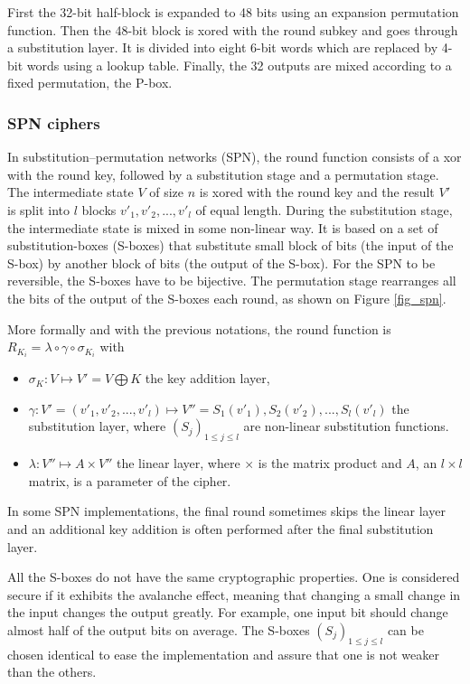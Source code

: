 \documentclass[11pt]{sdm}
\begin{document}
First the 32-bit half-block is expanded to 48 bits using an expansion permutation function.
Then the 48-bit block is xored with the round subkey and goes through a substitution layer.
It is divided into eight 6-bit words which are replaced by 4-bit words using a lookup table.
Finally, the 32 outputs are mixed according to a fixed permutation, the P-box.


\subsubsection{SPN ciphers}

In substitution–permutation networks (SPN), the round function consists of a xor with the round key, followed by a substitution stage and a permutation stage.
The intermediate state $V$ of size $n$ is xored with the round key and the result $V'$ is split into $l$ blocks $v'_1,v'_2,...,v'_l$ of equal length.
During the substitution stage, the intermediate state is mixed in some non-linear way.
It is based on a set of substitution-boxes (S-boxes) that substitute small block of bits (the input of the S-box) by another block of bits (the output of the S-box).
For the SPN to be reversible, the S-boxes have to be bijective.
The permutation stage rearranges all the bits of the output of the S-boxes each round, as shown on Figure \ref{fig_spn}.

More formally and with the previous notations, the round function is $R_{K_i} = \lambda \circ \gamma \circ \sigma_{K_i}$ with
\begin{itemize}
    \item $\sigma_{K}:V \mapsto V' = V \bigoplus K$ the key addition layer,
    \item $\gamma : V'=(v'_1,v'_2,...,v'_l) \mapsto V'' = S_1(v'_1),S_2(v'_2),...,S_l(v'_l)$ the substitution layer, where $(S_j)_{1\leq j \leq l}$ are non-linear substitution functions.
    \item $\lambda : V'' \mapsto A \times V''$ the linear layer, where $\times$ is the matrix product and $A$, an $l\times l$ matrix, is a parameter of the cipher.
\end{itemize}

In some SPN implementations, the final round sometimes skips the linear layer and an additional key addition is often performed after the final substitution layer.

All the S-boxes do not have the same cryptographic properties.
One is considered secure if it exhibits the avalanche effect, meaning that changing a small change in the input changes the output greatly.
For example, one input bit should change almost half of the output bits on average.
The S-boxes $(S_j)_{1\leq j \leq l}$ can be chosen identical to ease the implementation and assure that one is not weaker than the others.
\end{document}
